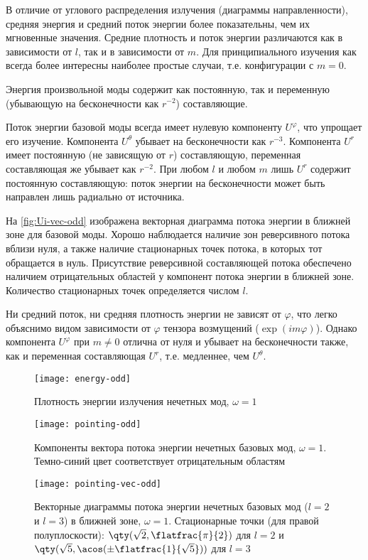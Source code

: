 \documentclass[\docroot/reports/draft/report.tex]{subfiles}
\begin{document}
    В отличие от углового распределения излучения (диаграммы направленности), средняя энергия и средний поток энергии более показательны, чем их мгновенные значения. Средние плотность и поток энергии различаются как в зависимости от $l$, так и в зависимости от $m$. Для принципиального изучения как всегда более интересны наиболее простые случаи, т.е. конфигурации с $m=0$.

    Энергия произвольной моды содержит как постоянную, так и переменную (убывающую на бесконечности как $r^{-2}$) составляющие.

    Поток энергии базовой моды всегда имеет нулевую компоненту $U^\varphi$, что упрощает его изучение. Компонента $U^\theta$ убывает на бесконечности как $r^{-3}$. Компонента $U^r$ имеет постоянную (не зависящую от $r$) составляющую, переменная составляющая же убывает как $r^{-2}$. При любом $l$ и любом $m$ лишь $U^r$ содержит постоянную составляющую: поток энергии на бесконечности может быть направлен лишь радиально от источника.

    На \autoref{fig:Ui-vec-odd} изображена векторная диаграмма потока энергии в ближней зоне для базовой моды. Хорошо наблюдается наличие зон реверсивного потока вблизи нуля, а также наличие стационарных точек потока, в которых тот обращается в нуль. Присутствие реверсивной составляющей потока обеспечено наличием отрицательных областей у компонент потока энергии в ближней зоне. Количество стационарных точек определяется числом $l$.

    Ни средний поток, ни средняя плотность энергии не зависят от $\varphi$, что легко объяснимо видом зависимости от $\varphi$ тензора возмущений ($\exp(i m \varphi)$). Однако компонента $U^\varphi$ при $ m \neq 0$ отлична от нуля и убывает на бесконечности также, как и переменная составляющая $U^r$, т.е. медленнее, чем $U^\theta$.

    \begin{figure}[!htb]%
        \centering\texttt{[image: energy-odd]}%
        \caption[]{Плотность энергии излучения нечетных мод, $\omega = 1$}%
        \label{fig:eps-odd}%
    \end{figure}

    \begin{figure}[!htb]%
        \centering\texttt{[image: pointing-odd]}%
        \caption[]{Компоненты вектора потока энергии нечетных базовых мод, $\omega = 1$. Темно-синий цвет соответствует отрицательным областям}%
        \label{fig:Ui-odd}%
    \end{figure}

    \begin{figure}[!htb]%
        \centering\texttt{[image: pointing-vec-odd]}%
        \caption[]{Векторные диаграммы потока энергии нечетных базовых мод ($l=2$ и $l=3$) в ближней зоне, $\omega = 1$. Стационарные точки (для правой полуплоскости): $\qty(\sqrt{2},\flatfrac{\pi}{2})$ для $l=2$ и $\qty(\sqrt{5},\acos(\pm\flatfrac{1}{\sqrt{5}}))$ для $l=3$}%
        \label{fig:Ui-vec-odd}%
    \end{figure}
\end{document}
